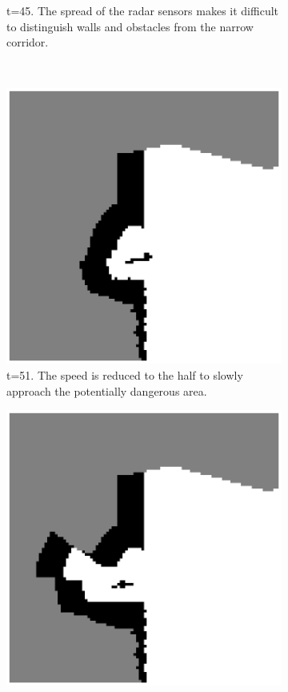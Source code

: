 \begin{figure}
\begin{subfigure}[t]{0.3\textwidth}
\caption{t=45. The spread of the radar sensors makes it difficult to distinguish walls and obstacles from the narrow corridor. }
\label{fig:sim_t45}
\end{subfigure}
\,
\begin{subfigure}[t]{0.3\textwidth}
\includegraphics[width=\textwidth]{Figures/Simulation/t51_half_speed.eps}
\caption{t=51. The speed is reduced to the half to slowly approach the potentially dangerous area.}
\label{fig:sim_t51}
\end{subfigure}
\begin{subfigure}[t]{0.3\textwidth}
\includegraphics[width=\textwidth]{Figures/Simulation/t68_is_opening.eps}

\end{subfigure}
\end{figure}
